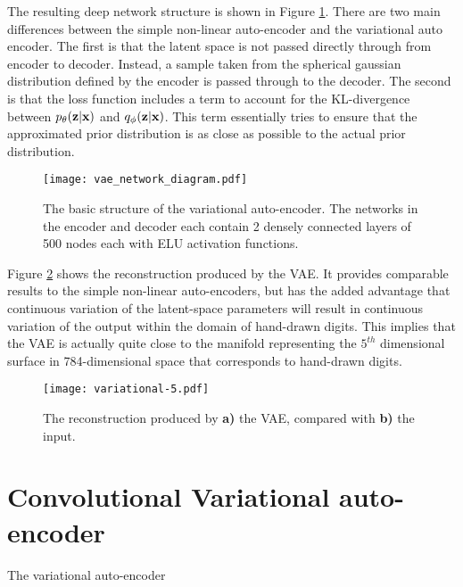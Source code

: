 \documentclass{article}
\begin{document}
The resulting deep network structure is shown in Figure \ref{fig:vae_network_diagram}. There are two main differences between the simple non-linear auto-encoder and the variational auto encoder. The first is that the latent space is not passed directly through from encoder to decoder. Instead, a sample taken from the spherical gaussian distribution defined by the encoder is passed through to the decoder. The second is that the loss function includes a term to account for the KL-divergence between $p_\theta(\textbf z|\textbf x)$ and $q_\phi(\textbf z|\textbf x)$. This term essentially tries to ensure that the approximated prior distribution is as close as possible to the actual prior distribution. 

\begin{figure}[h]
\label{fig:vae_network_diagram}
\begin{center}
\texttt{[image: vae\_network\_diagram.pdf]} 
\caption{The basic structure of the variational auto-encoder. The networks in the encoder and decoder each contain 2 densely connected layers of 500 nodes each with ELU activation functions.}
\end{center}
\end{figure}

Figure \ref{fig:variational_reconstruction} shows the reconstruction produced by the VAE. It provides comparable results to the simple non-linear auto-encoders, but has the added advantage that continuous variation of the latent-space parameters will result in continuous variation of the output within the domain of hand-drawn digits. This implies that the VAE is actually quite close to the manifold representing the $5^{th}$ dimensional surface in 784-dimensional space that corresponds to hand-drawn digits.

\begin{figure}[h]
\label{fig:variational_reconstruction}
\begin{center}
\texttt{[image: variational-5.pdf]} 
\caption{The reconstruction produced by \textbf{a)} the VAE, compared with \textbf{b)} the input.}
\end{center}
\end{figure}

\section{Convolutional Variational auto-encoder}
The variational auto-encoder 
\end{document}
